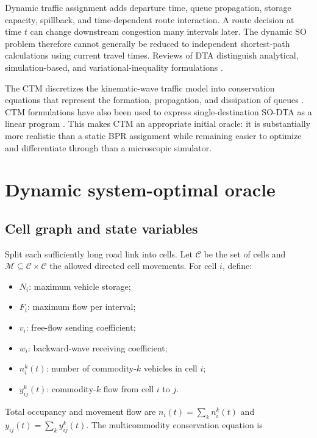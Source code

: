 \documentclass[11pt]{article}
\begin{document}
Dynamic traffic assignment adds departure time, queue propagation, storage capacity,
spillback, and time-dependent route interaction.  A route decision at time \(t\) can
change downstream congestion many intervals later.  The dynamic SO problem therefore
cannot generally be reduced to independent shortest-path calculations using current
travel times.  Reviews of DTA distinguish analytical, simulation-based, and
variational-inequality formulations \citep{peeta2001}.

The CTM discretizes the kinematic-wave traffic model into conservation equations that
represent the formation, propagation, and dissipation of queues
\citep{daganzo1994,daganzo1995}.  CTM formulations have also been used to express
single-destination SO-DTA as a linear program \citep{ziliaskopoulos2000}.  This makes
CTM an appropriate initial oracle: it is substantially more realistic than a static
BPR assignment while remaining easier to optimize and differentiate through than a
microscopic simulator.

\section{Dynamic system-optimal oracle}

\subsection{Cell graph and state variables}

Split each sufficiently long road link into cells.  Let \(\mathcal{C}\) be the set of
cells and \(\mathcal{M}\subseteq\mathcal{C}\times\mathcal{C}\) the allowed directed
cell movements.  For cell \(i\), define:

\begin{itemize}[leftmargin=1.5em]
  \item \(N_i\): maximum vehicle storage;
  \item \(F_i\): maximum flow per interval;
  \item \(v_i\): free-flow sending coefficient;
  \item \(w_i\): backward-wave receiving coefficient;
  \item \(n_i^k(t)\): number of commodity-\(k\) vehicles in cell \(i\);
  \item \(y_{ij}^k(t)\): commodity-\(k\) flow from cell \(i\) to \(j\).
\end{itemize}

Total occupancy and movement flow are
\(
  n_i(t)=\sum_k n_i^k(t)
\)
and
\(
  y_{ij}(t)=\sum_k y_{ij}^k(t)
\).
The multicommodity conservation equation is
\end{document}
